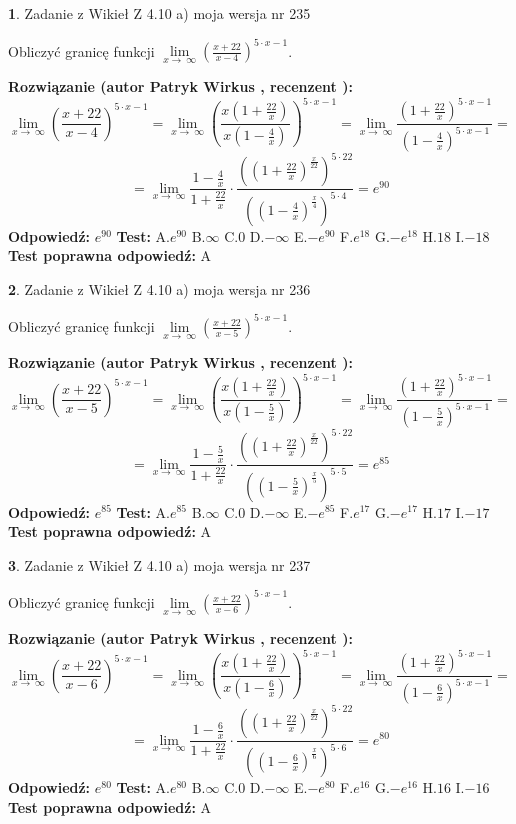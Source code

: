 \documentclass[12pt, a4paper]{article}
\theoremstyle{definition} %
\newtheorem{zad}{}
\newcommand{\zadStart}[1]{\begin{zad}#1\newline}
\newcommand{\zadStop}{\end{zad}}
\newcommand{\rozwStart}[2]{\noindent \textbf{Rozwiązanie (autor #1 , recenzent #2): }\newline}
\newcommand{\rozwStop}{\newline}
\newcommand{\odpStart}{\noindent \textbf{Odpowiedź:}\newline}
\newcommand{\odpStop}{\newline}
\newcommand{\testStart}{\noindent \textbf{Test:}\newline}
\newcommand{\testStop}{\newline}
\newcommand{\kluczStart}{\noindent \textbf{Test poprawna odpowiedź:}\newline}
\newcommand{\kluczStop}{\newline}
\begin{document}
\zadStart{Zadanie z Wikieł Z 4.10 a) moja wersja nr 235}

Obliczyć granicę funkcji  $\lim\limits_{x\to\ \infty}(\frac{x+22}{x-4})^{5\cdot x-1}$.
\zadStop
\rozwStart{Patryk Wirkus}{}
$$\lim\limits_{x\to\ \infty}(\frac{x+22}{x-4})^{5\cdot x-1} = \lim\limits_{x\to\ \infty}(\frac{x(1+\frac{22}{x})}{x(1-\frac{4}{x})})^{5\cdot x-1}=\lim\limits_{x\to\ \infty}\frac{(1+\frac{22}{x})^{5\cdot x-1}}{(1-\frac{4}{x})^{5\cdot x-1}}=$$
$$=\lim\limits_{x\to\ \infty}\frac{1-\frac{4}{x}}{1+\frac{22}{x}}\cdot\frac{((1+\frac{22}{x})^{\frac{x}{22}})^{5\cdot22}}{((1-\frac{4}{x})^{\frac{x}{4}})^{5\cdot4}}=e^{90}$$
\rozwStop
\odpStart
$e^{90}$
\odpStop
\testStart
A.$e^{90}$ B.$\infty$ C.$0$ D.$-\infty$ E.$-e^{90}$
F.$e^{18}$ G.$-e^{18}$
H.$18$
I.$-18$
\testStop
\kluczStart
A
\kluczStop



\zadStart{Zadanie z Wikieł Z 4.10 a) moja wersja nr 236}

Obliczyć granicę funkcji  $\lim\limits_{x\to\ \infty}(\frac{x+22}{x-5})^{5\cdot x-1}$.
\zadStop
\rozwStart{Patryk Wirkus}{}
$$\lim\limits_{x\to\ \infty}(\frac{x+22}{x-5})^{5\cdot x-1} = \lim\limits_{x\to\ \infty}(\frac{x(1+\frac{22}{x})}{x(1-\frac{5}{x})})^{5\cdot x-1}=\lim\limits_{x\to\ \infty}\frac{(1+\frac{22}{x})^{5\cdot x-1}}{(1-\frac{5}{x})^{5\cdot x-1}}=$$
$$=\lim\limits_{x\to\ \infty}\frac{1-\frac{5}{x}}{1+\frac{22}{x}}\cdot\frac{((1+\frac{22}{x})^{\frac{x}{22}})^{5\cdot22}}{((1-\frac{5}{x})^{\frac{x}{5}})^{5\cdot5}}=e^{85}$$
\rozwStop
\odpStart
$e^{85}$
\odpStop
\testStart
A.$e^{85}$ B.$\infty$ C.$0$ D.$-\infty$ E.$-e^{85}$
F.$e^{17}$ G.$-e^{17}$
H.$17$
I.$-17$
\testStop
\kluczStart
A
\kluczStop



\zadStart{Zadanie z Wikieł Z 4.10 a) moja wersja nr 237}

Obliczyć granicę funkcji  $\lim\limits_{x\to\ \infty}(\frac{x+22}{x-6})^{5\cdot x-1}$.
\zadStop
\rozwStart{Patryk Wirkus}{}
$$\lim\limits_{x\to\ \infty}(\frac{x+22}{x-6})^{5\cdot x-1} = \lim\limits_{x\to\ \infty}(\frac{x(1+\frac{22}{x})}{x(1-\frac{6}{x})})^{5\cdot x-1}=\lim\limits_{x\to\ \infty}\frac{(1+\frac{22}{x})^{5\cdot x-1}}{(1-\frac{6}{x})^{5\cdot x-1}}=$$
$$=\lim\limits_{x\to\ \infty}\frac{1-\frac{6}{x}}{1+\frac{22}{x}}\cdot\frac{((1+\frac{22}{x})^{\frac{x}{22}})^{5\cdot22}}{((1-\frac{6}{x})^{\frac{x}{6}})^{5\cdot6}}=e^{80}$$
\rozwStop
\odpStart
$e^{80}$
\odpStop
\testStart
A.$e^{80}$ B.$\infty$ C.$0$ D.$-\infty$ E.$-e^{80}$
F.$e^{16}$ G.$-e^{16}$
H.$16$
I.$-16$
\testStop
\kluczStart
A
\kluczStop
\end{document}
